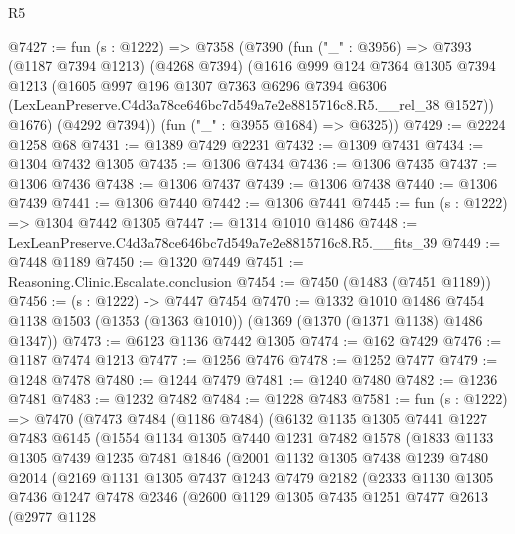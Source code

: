 \begin{lexlean}{R5}
\begin{coremodule}
@7427 := fun (s : @1222) =>
  @7358
    (@7390
      (fun ("_" : @3956) =>
      @7393
        (@1187 @7394 @1213)
        (@4268 @7394)
        (@1616
          @999
          @124
          @7364
          @1305
          @7394
          @1213
          (@1605
            @997
            @196
            @1307
            @7363
            @6296
            @7394
            @6306
            (LexLeanPreserve.C4d3a78ce646bc7d549a7e2e8815716c8.R5.__rel_38 @1527))
          @1676)
        (@4292 @7394))
      (fun ("_" : @3955 @1684) => @6325))
@7429 := @2224 @1258 @68
@7431 := @1389 @7429 @2231
@7432 := @1309 @7431
@7434 := @1304 @7432 @1305
@7435 := @1306 @7434
@7436 := @1306 @7435
@7437 := @1306 @7436
@7438 := @1306 @7437
@7439 := @1306 @7438
@7440 := @1306 @7439
@7441 := @1306 @7440
@7442 := @1306 @7441
@7445 := fun (s : @1222) => @1304 @7442 @1305
@7447 := @1314 @1010 @1486
@7448 := LexLeanPreserve.C4d3a78ce646bc7d549a7e2e8815716c8.R5.__fits_39
@7449 := @7448 @1189
@7450 := @1320 @7449
@7451 := Reasoning.Clinic.Escalate.conclusion
@7454 := @7450 (@1483 (@7451 @1189))
@7456 := (s : @1222) -> @7447 @7454
@7470 := @1332
    @1010
    @1486
    @7454
    @1138
    @1503
    (@1353 (@1363 @1010))
    (@1369 (@1370 (@1371 @1138) @1486 @1347))
@7473 := @6123 @1136 @7442 @1305
@7474 := @162 @7429
@7476 := @1187 @7474 @1213
@7477 := @1256 @7476
@7478 := @1252 @7477
@7479 := @1248 @7478
@7480 := @1244 @7479
@7481 := @1240 @7480
@7482 := @1236 @7481
@7483 := @1232 @7482
@7484 := @1228 @7483
@7581 := fun (s : @1222) =>
  @7470
    (@7473
      @7484
      (@1186 @7484)
      (@6132
        @1135
        @1305
        @7441
        @1227
        @7483
        @6145
        (@1554
          @1134
          @1305
          @7440
          @1231
          @7482
          @1578
          (@1833
            @1133
            @1305
            @7439
            @1235
            @7481
            @1846
            (@2001
              @1132
              @1305
              @7438
              @1239
              @7480
              @2014
              (@2169
                @1131
                @1305
                @7437
                @1243
                @7479
                @2182
                (@2333
                  @1130
                  @1305
                  @7436
                  @1247
                  @7478
                  @2346
                  (@2600
                    @1129
                    @1305
                    @7435
                    @1251
                    @7477
                    @2613
                    (@2977
                      @1128

\end{coremodule}
\end{lexlean}
